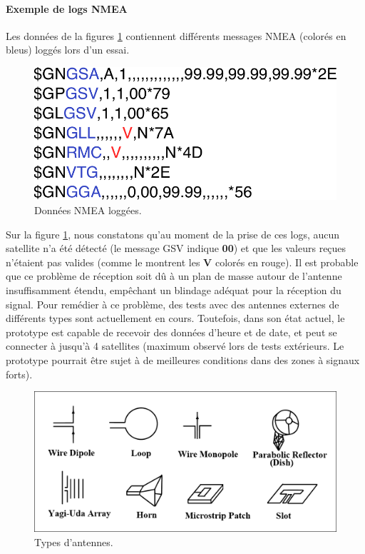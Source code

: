 \paragraph*{Exemple de logs NMEA}

Les données de la figures \ref{fig:donnees-nmea} contiennent différents messages NMEA (colorés en bleus) loggés lors d'un essai.

\begin{figure}[!h]
	\centering
	\includegraphics[width=0.5\linewidth]{../figures/code/donnees-nmea}
	\caption{Données NMEA loggées.}
	\label{fig:donnees-nmea}
\end{figure}

Sur la figure \ref{fig:donnees-nmea}, nous constatons qu'au moment de la prise de ces logs, aucun satellite n'a été détecté (le message GSV indique \textbf{00}) et que les valeurs reçues n'étaient pas valides (comme le montrent les \textbf{V} colorés en rouge). Il est probable que ce problème de réception soit dû à un plan de masse autour de l'antenne insuffisamment étendu, empêchant un blindage adéquat pour la réception du signal. Pour remédier à ce problème, des tests avec des antennes externes de différents types sont actuellement en cours. Toutefois, dans son état actuel, le prototype est capable de recevoir des données d'heure et de date, et peut se connecter à jusqu'à 4 satellites (maximum observé lors de tests extérieurs. Le prototype pourrait être sujet à de meilleures conditions dans des zones à signaux forts).

\begin{figure}[h]
	\centering
	\includegraphics[width=.61\linewidth]{../figures/code/antenna-types}
	\caption{Types d'antennes.}
	\label{fig:antenna-types}
\end{figure}

